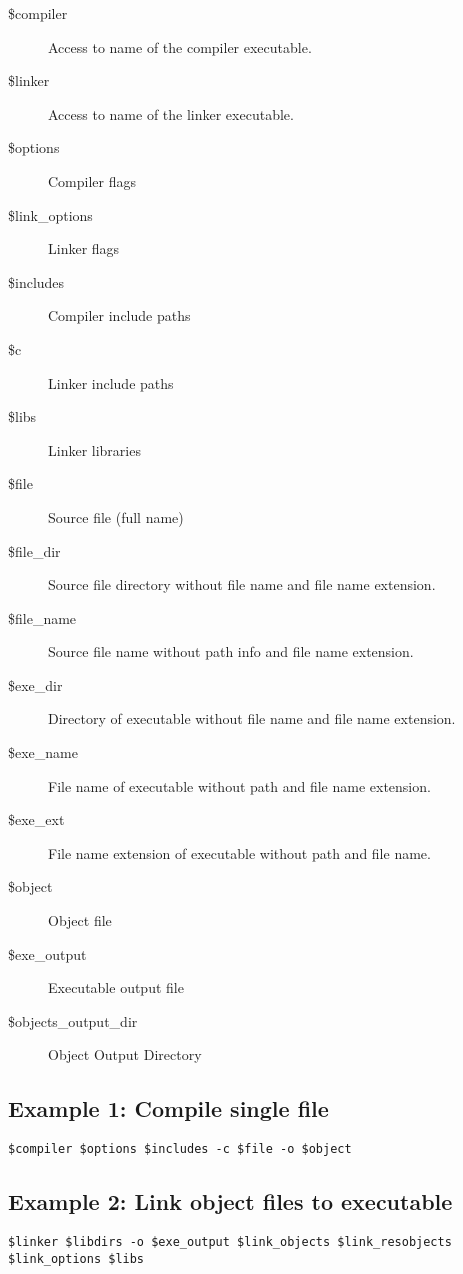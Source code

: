 \begin{description}
\item[\$compiler] Access to name of the compiler executable.
\item[\$linker] Access to name of the linker executable.
\item[\$options] Compiler flags
\item[\$link\_options] Linker flags
\item[\$includes] Compiler include paths
\item[\$c] Linker include paths
\item[\$libs] Linker libraries
\item[\$file] Source file (full name)
\item[\$file\_dir] Source file directory without file name and file name extension.
\item[\$file\_name] Source file name without path info and file name extension.
\item[\$exe\_dir] Directory of executable without file name and file name extension.
\item[\$exe\_name] File name of executable without path and file name extension.
\item[\$exe\_ext] File name extension of executable without path and file name.
\item[\$object] Object file
\item[\$exe\_output] Executable output file
\item[\$objects\_output\_dir] Object Output Directory
\end{description}

\subsection{Example 1: Compile single file}

\begin{lstlisting}
$compiler $options $includes -c $file -o $object
\end{lstlisting}

\subsection{Example 2: Link object files to executable}

\begin{lstlisting}
$linker $libdirs -o $exe_output $link_objects $link_resobjects 
$link_options $libs
\end{lstlisting}

